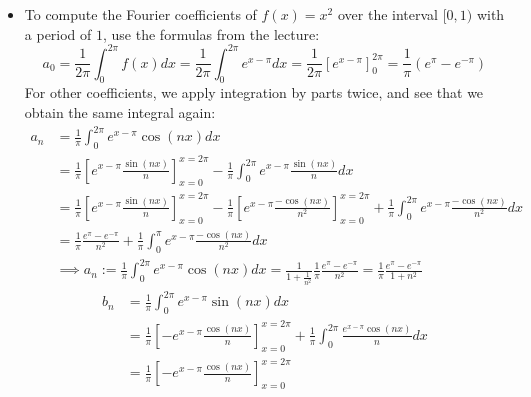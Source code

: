 \documentclass[11pt]{article}
\begin{document}
\begin{solution}     
\begin{itemize}
\item To compute the Fourier coefficients of $f(x) = x^2$ over the interval $[0,1)$ with a period of $1$, use the formulas from the lecture:
        \[
            a_0 = \frac{1}{2\pi}\int_{0}^{2\pi} f(x) dx  = \frac{1}{2\pi}\int_{0}^{2\pi} e^{x-\pi} dx  = \frac{1}{2\pi}\left[ e^{x-\pi} \right]_{0}^{2\pi} = \frac{1}{\pi}\left(e^{\pi} - e^{-\pi}\right)
        \]
        For other coefficients, we apply integration by parts twice, and see that we obtain the same integral again:
        \begin{align*}
            a_n 
            &
            = 
            \frac{1}{\pi}
            \int_{0}^{2\pi} e^{x - \pi} \cos( n x) dx
            \\&
            =
            \frac{1}{\pi}
            \left[ e^{x - \pi} \frac{ \sin(n x) }{ n } \right]_{x=0}^{x=2\pi}
            -
            \frac{1}{\pi}
            \int_{0}^{2\pi} e^{x-\pi}\frac{ \sin( n x) }{ n } dx
            \\&
	=
            \frac{1}{\pi}
            \left[ e^{x - \pi} \frac{ \sin(n x) }{ n } \right]_{x=0}^{x=2\pi}
            -
            \frac{1}{\pi}
            \left[ e^{x - \pi} \frac{ -\cos(n x) }{ n^2 } \right]_{x=0}^{x=2\pi}
            +
            \frac{1}{\pi}
            \int_{0}^{2\pi} e^{x-\pi}\frac{ -\cos(n x) }{ n^2 } dx
	\\&
	=
	\frac{1}{\pi}\frac{e^{\pi} - e^{-\pi}}{n^2}
            +
            \frac{1}{\pi}
            \int_{0}^{\pi} e^{x-\pi}\frac{ -\cos(n x) }{ n^2 } dx
	\\&
	\implies a_n := 
            \frac{1}{\pi}
            \int_{0}^{2\pi} e^{x - \pi} \cos( n x) dx = \frac{1}{1+\frac{1}{n^2}}\frac{1}{\pi}\frac{e^{\pi} - e^{-\pi}}{n^2} =  \frac{1}{\pi}\frac{e^{\pi} - e^{-\pi}}{1 + n^2}
        \end{align*}
        \begin{align*}
            b_n 
            &
            = 
            \frac{1}{\pi}
            \int_{0}^{2\pi} e^{x - \pi} \sin(n x) dx
            \\&
            =
            \frac{1}{\pi}
            \left[- e^{x - \pi} \frac{ \cos( n x) }{ n } \right]_{x=0}^{x=2\pi}
            +
            \frac{1}{\pi}
            \int_{0}^{2\pi} \frac{ e^{x - \pi} \cos( n x) }{ n } dx
            \\&
            =
            \frac{1}{\pi}
             \left[- e^{x - \pi} \frac{ \cos( n x) }{ n } \right]_{x=0}^{x=2\pi}

\end{align*}
\end{itemize}
\end{solution}
\end{document}
